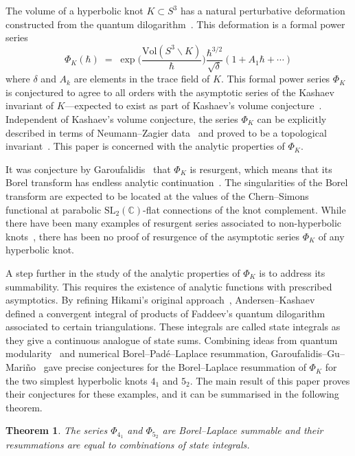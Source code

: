 \documentclass[12pt,reqno]{amsart}
\newtheorem{theorem}{Theorem}[section]
\theoremstyle{definition}
\def\BC{\mathbb C}
\def\SL{\mathrm{SL}}
\def\be{\begin{equation}}
\def\ee{\end{equation}}
\renewcommand{\=}{\;=\;}
\begin{document}
The volume of a hyperbolic knot $K\subset S^3$ has a natural perturbative deformation constructed from the quantum dilogarithm~\cite{Hikami:stateint}. This deformation is a formal power series
\be
  \Phi_{K}(\hbar)
  \=
  \exp\Big(\frac{\mathrm{Vol}(S^3\backslash K)}{\hbar}\Big)\frac{\hbar^{3/2}}{\sqrt{\delta}}(1+A_1\hbar+\cdots)
\ee
where $\delta$ and $A_k$ are elements in the trace field of $K$. This formal power series $\Phi_{K}$ is conjectured to agree to all orders with the asymptotic series of the Kashaev invariant of $K$---expected to exist as part of Kashaev's volume conjecture~\cite{Kashaev:VC}. Independent of Kashaev's volume conjecture, the series $\Phi_{K}$ can be explicitly described in terms of Neumann--Zagier data~\cite{DimGar:QC} and proved to be a topological invariant~\cite{GSW}. This paper is concerned with the analytic properties of $\Phi_{K}$.

\medskip

It was conjecture by Garoufalidis~\cite{Gar:resCS} that $\Phi_{K}$ is resurgent, which means that its Borel transform has endless analytic continuation~\cite{EcalleI}. The singularities of the Borel transform are expected to be located at the values of the Chern--Simons functional at parabolic $\SL_{2}(\BC)$-flat connections of the knot complement. While there have been many examples of resurgent series associated to non-hyperbolic knots~\cite{Zagier:Vas,CG:KZser}, there has been no proof of resurgence of the asymptotic series $\Phi_{K}$ of any hyperbolic knot.

\medskip

A step further in the study of the analytic properties of $\Phi_{K}$ is to address its summability. This requires the existence of analytic functions with prescribed asymptotics. By refining Hikami's original approach~\cite{Hikami:stateint}, Andersen--Kashaev~\cite{AK:I} defined a convergent integral of products of Faddeev's quantum dilogarithm associated to certain triangulations. These integrals are called state integrals as they give a continuous analogue of state sums. Combining ideas from quantum modularity~\cite{GZ:RQMOD} and numerical Borel--Padé--Laplace resummation, Garoufalidis--Gu--Mariño~\cite{GGM:I} gave precise conjectures for the Borel--Laplace resummation of $\Phi_{K}$ for the two simplest hyperbolic knots $4_1$ and $5_2$. The main result of this paper proves their conjectures for these examples, and it can be summarised in the following theorem.

\begin{theorem}\label{thm:4152}
The series $\Phi_{4_1}$ and $\Phi_{5_2}$ are Borel--Laplace summable and their resummations are equal to combinations of state integrals.
\end{theorem}
\end{document}
